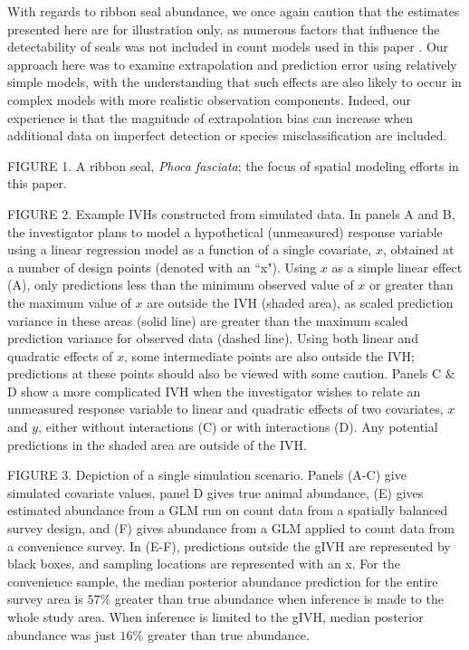 \documentclass[12pt,english]{article}
\begin{document}
\begin{spacing}{1.9}
With regards to ribbon seal abundance, we once again caution that the estimates presented here are for illustration only, as numerous factors that influence the detectability of seals was not included in count models used in this paper \citep[but see][]{ConnEtAl2014}. Our approach here was to examine extrapolation and prediction error using relatively simple models, with the understanding that such effects are also likely to occur in complex models with more realistic observation components.  Indeed, our experience is that the magnitude of extrapolation bias can increase when additional data on imperfect detection or species misclassification are included. 




\clearpage

FIGURE 1. A ribbon seal, {\it Phoca fasciata}; the focus of spatial modeling efforts in this paper.

FIGURE 2. Example IVHs constructed from simulated data.  In panels A and B, the investigator plans to model a hypothetical (unmeasured) response variable using a linear regression model as a function of a single covariate, $x$, obtained at a number of design points (denoted with an ``x").  Using $x$ as a simple linear effect (A), only predictions less than the minimum observed value of $x$ or greater than the maximum value of $x$ are outside the IVH (shaded area), as scaled prediction variance in these areas (solid line) are greater than the maximum scaled prediction variance for observed data (dashed line).  Using both linear and quadratic effects of $x$, some intermediate points are also outside the IVH; predictions at these points should also be viewed with some caution.  Panels C $\&$ D show a more complicated IVH when the investigator wishes to relate an unmeasured response variable to linear and quadratic effects of two covariates, $x$ and $y$, either without interactions (C) or with interactions (D).  Any potential predictions in the shaded area are outside of the IVH.

FIGURE 3.  Depiction of a single simulation scenario.  Panels (A-C) give simulated covariate values, panel D gives true animal abundance, (E) gives estimated abundance from a GLM run on count data from a spatially balanced survey design, and (F) gives abundance from a GLM applied to count data from a convenience survey.  In (E-F), predictions outside the gIVH are represented by black boxes, and sampling locations are represented with an x.  For the convenience sample, the median posterior abundance prediction for the entire survey area is $57\%$ greater than true abundance when inference is made to the whole study area.  When inference is limited to the gIVH, median posterior abundance was just $16\%$ greater than true abundance.


\end{spacing}
\end{document}
